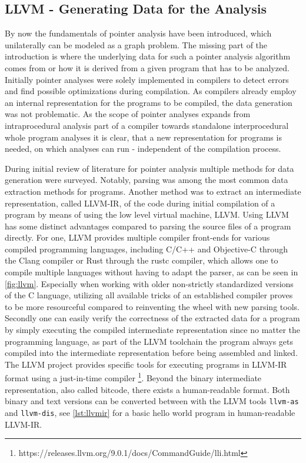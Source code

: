 \subsection{LLVM - Generating Data for the Analysis}
By now the fundamentals of pointer analysis have been introduced, which unilaterally can be modeled as a graph problem.
The missing part of the introduction is where the underlying data for such a pointer analysis algorithm comes from or how it is derived from a given program that has to be analyzed.
Initially pointer analyses were solely implemented in compilers to detect errors and find possible optimizations during compilation. As compilers already employ an internal representation for the programs to be compiled, the data generation was not problematic.
As the scope of pointer analyses expands from intraprocedural analysis part of a compiler towards standalone interprocedural whole program analyses it is clear, that a new representation for programs is needed, on which analyses can run - independent of the compilation process.

During initial review of literature for pointer analysis multiple methods for data generation were surveyed. Notably, parsing was among the most common data extraction methods for programs. Another method was to extract an intermediate representation, called LLVM-IR, of the code during initial compilation of a program by means of using the low level virtual machine, LLVM. Using LLVM has some distinct advantages compared to parsing the source files of a program directly.
For one, LLVM provides multiple compiler front-ends for various compiled programming languages, including C/C++ and Objective-C through the Clang compiler or Rust through the rustc compiler, which allows one to compile multiple languages without having to adapt the parser, as can be seen in \autoref{fig:llvm}.
Especially when working with older non-strictly standardized versions of the C language, utilizing all available tricks of an established compiler proves to be more resourceful compared to reinventing the wheel with new parsing tools.
Secondly one can easily verify the correctness of the extracted data for a program by simply executing the compiled intermediate representation since no matter the programming language, as part of the LLVM toolchain the program always gets compiled into the intermediate representation before being assembled and linked. The LLVM project provides specific tools for executing programs in LLVM-IR format using a just-in-time compiler \footnote{https://releases.llvm.org/9.0.1/docs/CommandGuide/lli.html}. Beyond the binary intermediate representation, also called bitcode, there exists a human-readable format. Both binary and text versions can be converted between with the LLVM tools \verb|llvm-as| and \verb|llvm-dis|, see \autoref{lst:llvmir} for a basic hello world program in human-readable LLVM-IR.


